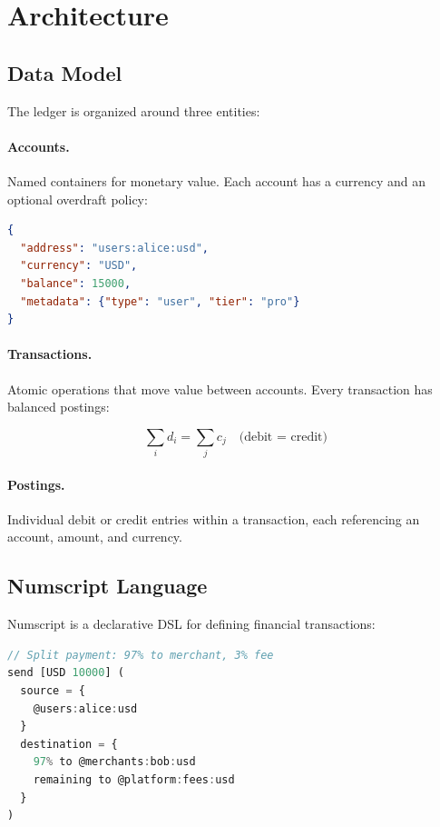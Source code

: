 \documentclass[11pt,twocolumn]{article}
\begin{document}
\section{Architecture}

\subsection{Data Model}

The ledger is organized around three entities:

\paragraph{Accounts.} Named containers for monetary value. Each account has a currency and an optional overdraft policy:

\begin{lstlisting}[language=JSON]
{
  "address": "users:alice:usd",
  "currency": "USD",
  "balance": 15000,
  "metadata": {"type": "user", "tier": "pro"}
}
\end{lstlisting}

\paragraph{Transactions.} Atomic operations that move value between accounts. Every transaction has balanced postings:

\begin{equation}
    \sum_{i} d_i = \sum_{j} c_j \quad \text{(debit = credit)}
\end{equation}

\paragraph{Postings.} Individual debit or credit entries within a transaction, each referencing an account, amount, and currency.

\subsection{Numscript Language}

Numscript is a declarative DSL for defining financial transactions:

\begin{lstlisting}[language=TypeScript]
// Split payment: 97% to merchant, 3% fee
send [USD 10000] (
  source = {
    @users:alice:usd
  }
  destination = {
    97% to @merchants:bob:usd
    remaining to @platform:fees:usd
  }
)
\end{lstlisting}
\end{document}
